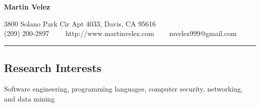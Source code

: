 \documentclass[10pt,letterpaper]{article}
\newenvironment{indentsection}[1]%
{\begin{list}{}%
	{\setlength{\leftmargin}{#1}}%
	\item[]%
}
{\end{list}}
\begin{document}
\begin{center}
{\LARGE \sc \textbf{Martin Velez}}

3800 Solano Park Cir Apt 4033, Davis, CA 95616
\\
(209) 200-2897\ \ \textbullet
\ \ http://www.martinvelez.com \ \textbullet
\ \ mvelez999@gmail.com
\end{center}

\hrule
\vspace{-0.4em}
\subsection*{Research Interests}

\begin{indentsection}{\parindent}
Software engineering, programming languages, computer security, networking,
and data mining 
\end{indentsection}


\vspace{-0.4em}

\vspace{-0.4em}

\vspace{-0.4em}

\vspace{-0.4em}

\end{document}
